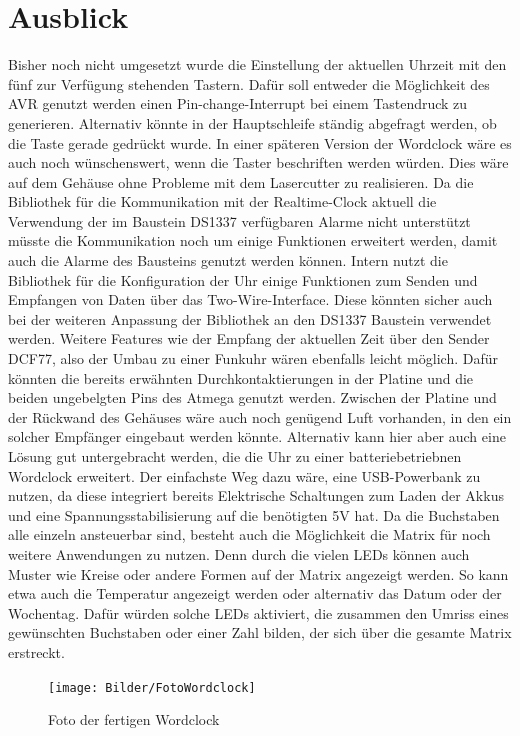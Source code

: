 \documentclass[12pt,journal,compsoc]{IEEEtran}
\begin{document}
\section{Ausblick}
Bisher noch nicht umgesetzt wurde die Einstellung der aktuellen Uhrzeit mit den fünf zur Verfügung stehenden Tastern. Dafür soll entweder die Möglichkeit des AVR genutzt werden einen Pin-change-Interrupt  bei einem Tastendruck zu generieren. Alternativ könnte in der Hauptschleife ständig abgefragt werden, ob die Taste gerade gedrückt wurde. In einer späteren Version der Wordclock wäre es auch noch wünschenswert, wenn die Taster  beschriften werden würden. Dies wäre auf dem Gehäuse ohne Probleme mit dem Lasercutter zu realisieren.
Da die Bibliothek für die Kommunikation mit der Realtime-Clock aktuell die Verwendung der im Baustein DS1337 verfügbaren Alarme nicht unterstützt müsste die Kommunikation noch um einige Funktionen erweitert werden, damit auch die Alarme des Bausteins genutzt werden können. Intern nutzt die Bibliothek für die Konfiguration der Uhr einige Funktionen zum Senden und Empfangen von Daten über das Two-Wire-Interface. Diese könnten sicher auch bei der weiteren Anpassung der Bibliothek an den DS1337 Baustein verwendet werden.
Weitere Features wie der Empfang der aktuellen Zeit über den Sender DCF77, also der Umbau zu einer Funkuhr wären ebenfalls leicht möglich. Dafür könnten die bereits erwähnten Durchkontaktierungen in der Platine und die beiden ungebelgten Pins des Atmega genutzt werden. Zwischen der Platine und der Rückwand des Gehäuses wäre auch noch genügend Luft vorhanden, in den ein solcher Empfänger eingebaut werden könnte. Alternativ kann hier aber auch eine Lösung gut untergebracht werden, die die Uhr zu einer batteriebetriebnen Wordclock erweitert. Der einfachste Weg dazu wäre, eine USB-Powerbank zu nutzen, da diese integriert bereits Elektrische Schaltungen zum Laden der Akkus und eine Spannungsstabilisierung auf die benötigten 5V hat.
Da die Buchstaben alle einzeln ansteuerbar sind, besteht auch die Möglichkeit die Matrix für noch weitere Anwendungen zu nutzen. Denn durch die vielen LEDs können auch Muster wie Kreise oder andere Formen auf der Matrix angezeigt werden. So kann etwa auch die Temperatur angezeigt werden oder alternativ das Datum oder der Wochentag. Dafür würden solche LEDs aktiviert, die zusammen den Umriss eines gewünschten Buchstaben oder einer Zahl bilden, der sich über die gesamte Matrix erstreckt.
\begin{figure}
	\centering
	\texttt{[image: Bilder/FotoWordclock]}
	\caption{Foto der fertigen Wordclock} 
	\label{fig:Foto}
\end{figure}

\nocite{*}
%
%





\end{document}
